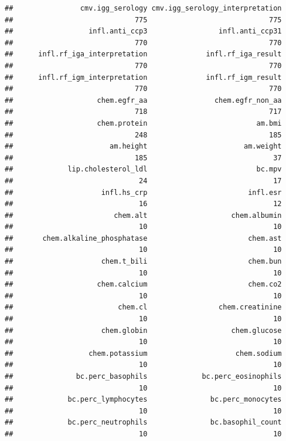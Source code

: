 \documentclass[
]{article}
\begin{document}
\begin{verbatim}
##                cmv.igg_serology cmv.igg_serology_interpretation 
##                             775                             775 
##                  infl.anti_ccp3                 infl.anti_ccp31 
##                             770                             770 
##      infl.rf_iga_interpretation              infl.rf_iga_result 
##                             770                             770 
##      infl.rf_igm_interpretation              infl.rf_igm_result 
##                             770                             770 
##                    chem.egfr_aa                chem.egfr_non_aa 
##                             718                             717 
##                    chem.protein                          am.bmi 
##                             248                             185 
##                       am.height                       am.weight 
##                             185                              37 
##             lip.cholesterol_ldl                          bc.mpv 
##                              24                              17 
##                     infl.hs_crp                        infl.esr 
##                              16                              12 
##                        chem.alt                    chem.albumin 
##                              10                              10 
##       chem.alkaline_phosphatase                        chem.ast 
##                              10                              10 
##                     chem.t_bili                        chem.bun 
##                              10                              10 
##                    chem.calcium                        chem.co2 
##                              10                              10 
##                         chem.cl                 chem.creatinine 
##                              10                              10 
##                     chem.globin                    chem.glucose 
##                              10                              10 
##                  chem.potassium                     chem.sodium 
##                              10                              10 
##               bc.perc_basophils             bc.perc_eosinophils 
##                              10                              10 
##             bc.perc_lymphocytes               bc.perc_monocytes 
##                              10                              10 
##             bc.perc_neutrophils               bc.basophil_count 
##                              10                              10 

\end{verbatim}
\end{document}
